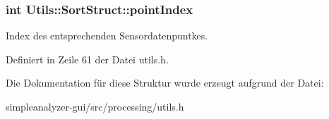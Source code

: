 \hypertarget{structUtils_1_1SortStruct_ad470a3f9a230e66a47fd022bf7a4a70e}{
\subsubsection[{point\-Index}]{\setlength{\rightskip}{0pt plus 5cm}int Utils\-::\-Sort\-Struct\-::point\-Index}}\label{structUtils_1_1SortStruct_ad470a3f9a230e66a47fd022bf7a4a70e}
Index des entsprechenden Sensordatenpuntkes. 

Definiert in Zeile 61 der Datei utils.\-h.



Die Dokumentation für diese Struktur wurde erzeugt aufgrund der Datei\-:\begin{DoxyCompactItemize}
\item 
simpleanalyzer-\/gui/src/processing/utils.\-h\end{DoxyCompactItemize}
